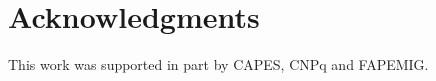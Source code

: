 \documentclass{sig-alternate-05-2015}
\begin{document}









\section*{Acknowledgments}
This work was supported in part by CAPES, CNPq and FAPEMIG.


%



%
%
\end{document}
